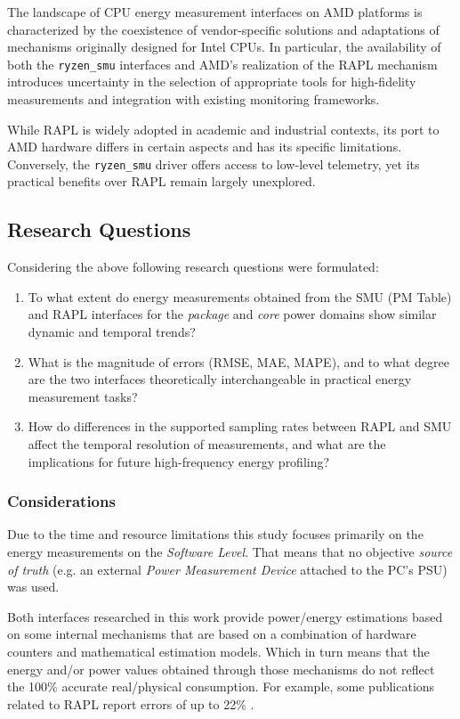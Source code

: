 The landscape of \gls{CPU} energy measurement interfaces on AMD platforms is
characterized by the coexistence of vendor-specific solutions and
adaptations of mechanisms originally designed for Intel \gls{CPU}s. In
particular, the availability of both the \texttt{ryzen\_smu} interfaces
and AMD's realization of the \gls{RAPL} mechanism introduces uncertainty in
the selection of appropriate tools for high-fidelity measurements and
integration with existing monitoring frameworks.

While \gls{RAPL} is widely adopted in academic and industrial contexts, its
port to AMD hardware differs in certain aspects and has its specific
limitations. Conversely, the \texttt{ryzen\_smu} driver offers access to
low-level telemetry, yet its practical benefits over \gls{RAPL} remain
largely unexplored.

\subsection{Research Questions}
 
Considering the above following research questions were formulated:

\begin{enumerate}
  \item To what extent do energy measurements obtained from the
        \gls{SMU} (\gls{PM} Table) and \gls{RAPL} interfaces for the
        \emph{package} and \emph{core} power domains show similar
        dynamic and temporal trends?
      \item What is the magnitude of errors (\gls{RMSE}, \gls{MAE}, \gls{MAPE}),
        and to what degree are the two interfaces theoretically interchangeable
        in practical energy measurement tasks?
      \item How do differences in the supported sampling rates between
        \gls{RAPL} and \gls{SMU} affect the temporal resolution of measurements,
        and what are the implications for future high-frequency energy profiling?
\end{enumerate}

\subsubsection{Considerations}

Due to the time and resource limitations this study focuses primarily on the
energy measurements on the \emph{Software Level}. That means that no objective
\emph{source of truth} (e.g. an external \emph{Power Measurement Device}
attached to the \gls{PC}'s \gls{PSU}) was used.

Both interfaces researched in this work provide power/energy estimations based
on some internal mechanisms that are based on a combination of hardware
counters and mathematical estimation models. Which in turn means that the
energy and/or power values obtained through those mechanisms do not reflect
the 100\% accurate real/physical consumption. For example, some publications
related to \gls{RAPL} report errors of up to 22\% \parencite{Paniego2018}.
